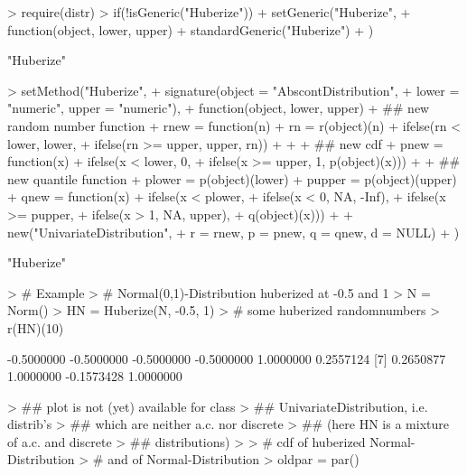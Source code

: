 \documentclass[11pt]{article}
\begin{document}
\begin{Schunk}
\begin{Sinput}
> require(distr)
> if(!isGeneric("Huberize")) 
+     setGeneric("Huberize", 
+        function(object, lower, upper) 
+                 standardGeneric("Huberize")
+                 )
\end{Sinput}
\begin{Soutput}
[1] "Huberize"
\end{Soutput}
\begin{Sinput}
> setMethod("Huberize",
+           signature(object = "AbscontDistribution", 
+           lower = "numeric", upper = "numeric"),
+           function(object, lower, upper){
+             ## new random number function
+             rnew = function(n){
+               rn = r(object)(n)
+               ifelse(rn < lower, lower, 
+                      ifelse(rn >= upper, upper, rn))
+             }
+ 
+             ## new cdf 
+             pnew = function(x)
+               ifelse(x < lower, 0, 
+                      ifelse(x >= upper, 1, p(object)(x)))
+ 
+             ## new quantile function
+             plower = p(object)(lower)
+             pupper = p(object)(upper)
+             qnew = function(x)
+               ifelse(x < plower,
+                      ifelse(x < 0, NA, -Inf),
+                      ifelse(x >= pupper,
+                             ifelse(x > 1, NA, upper),
+                             q(object)(x)))
+ 
+             new("UnivariateDistribution",
+                 r = rnew, p = pnew, q = qnew, d = NULL)
+           })
\end{Sinput}
\begin{Soutput}
[1] "Huberize"
\end{Soutput}
\begin{Sinput}
> # Example
> # Normal(0,1)-Distribution huberized at -0.5 and 1
> N = Norm()
> HN = Huberize(N, -0.5, 1)
> # some huberized randomnumbers
> r(HN)(10)
\end{Sinput}
\begin{Soutput}
 [1] -0.5000000 -0.5000000 -0.5000000 -0.5000000  1.0000000  0.2557124
 [7]  0.2650877  1.0000000 -0.1573428  1.0000000
\end{Soutput}
\begin{Sinput}
> ## plot is not (yet) available for class
> ## UnivariateDistribution, i.e. distrib's
> ## which are neither a.c. nor discrete 
> ## (here HN is a mixture of a.c. and discrete 
> ## distributions)
> 
> # cdf of huberized Normal-Distribution
> # and of Normal-Distribution
> oldpar = par()

\end{Sinput}
\end{Schunk}
\end{document}
